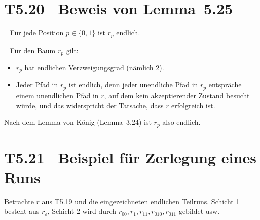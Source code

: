 \documentclass[fontsize=11pt, twoside=false, numbers=autoenddot]{scrbook}
\begin{document}
\begin{center}
\end{center}

\section*{T5.20~ Beweis von Lemma~5.25}

~
Für jede Position $p \in \{0,1\}$ ist $r_p$ endlich.

\parII
{}~
Für den Baum $r_p$ gilt:
%
\begin{itemize}
  \item
    $r_p$ hat endlichen Verzweigungsgrad (nämlich 2).
  \item
    Jeder Pfad in $r_p$ ist endlich,
    denn jeder unendliche Pfad in $r_p$ entspräche einem
    unendlichen Pfad in $r$, auf dem kein akzeptierender Zustand besucht würde,
    und das widerspricht der Tatsache, dass $r$ erfolgreich ist.
\end{itemize}
%
Nach dem Lemma von K\H onig (Lemma~3.24) ist $r_p$ also endlich.
\qedhere

\section*{T5.21~ Beispiel für Zerlegung eines Runs}

Betrachte $r$ aus T5.19 und die eingezeichneten endlichen Teilruns.
Schicht 1 besteht aus $r_\varepsilon$,
Schicht 2 wird durch $r_{00}, r_1, r_{11}, r_{010}, r_{011}$ gebildet
usw.

\pagebreak
\end{document}
